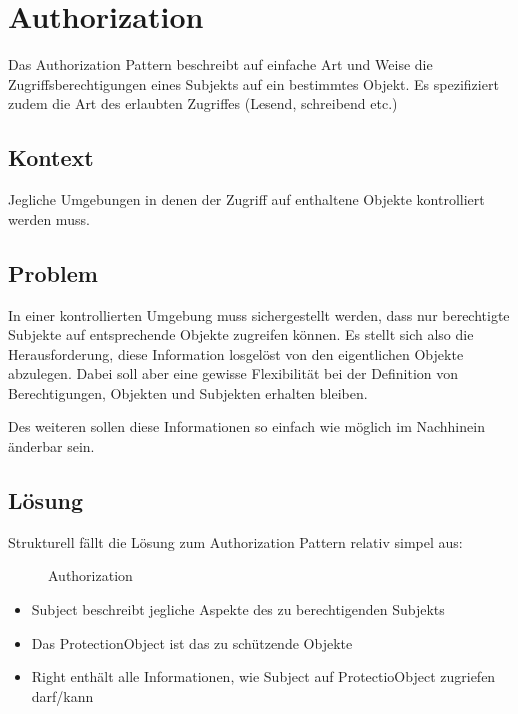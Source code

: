 \section{Authorization}

Das Authorization Pattern beschreibt auf einfache Art und Weise die Zugriffsberechtigungen eines Subjekts auf ein bestimmtes Objekt. Es spezifiziert zudem die Art des erlaubten Zugriffes (Lesend, schreibend etc.)

\subsection*{Kontext}
Jegliche Umgebungen in denen der Zugriff auf enthaltene Objekte kontrolliert werden muss.

\subsection*{Problem}
In einer kontrollierten Umgebung muss sichergestellt werden, dass nur berechtigte Subjekte auf entsprechende Objekte zugreifen können. Es stellt sich also die Herausforderung, diese Information losgelöst von den eigentlichen Objekte abzulegen. Dabei soll aber eine gewisse Flexibilität bei der Definition von Berechtigungen, Objekten und Subjekten erhalten bleiben.

Des weiteren sollen diese Informationen so einfach wie möglich im Nachhinein änderbar sein.

\subsection*{Lösung}
Strukturell fällt die Lösung zum Authorization Pattern relativ simpel aus:

\begin{figure}[H]
	\begin{center}
	\end{center}
\caption{Authorization}
\end{figure}

\begin{itemize}
	\item Subject beschreibt jegliche Aspekte des zu berechtigenden Subjekts
	\item Das ProtectionObject ist das zu schützende Objekte
	\item Right enthält alle Informationen, wie Subject auf ProtectioObject zugriefen darf/kann
\end{itemize}

